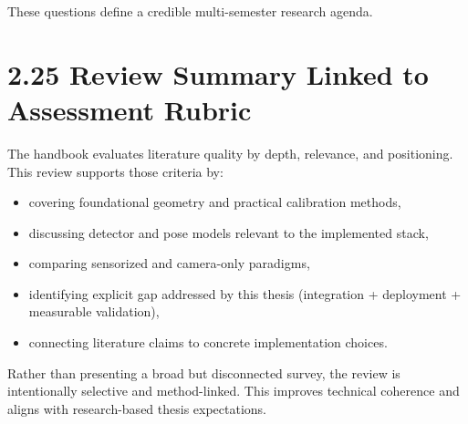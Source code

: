These questions define a credible multi-semester research agenda.



\section{2.25 Review Summary Linked to Assessment Rubric}
The handbook evaluates literature quality by depth, relevance, and positioning. This review supports those criteria by:
\begin{itemize}
  \item covering foundational geometry and practical calibration methods,
  \item discussing detector and pose models relevant to the implemented stack,
  \item comparing sensorized and camera-only paradigms,
  \item identifying explicit gap addressed by this thesis (integration + deployment + measurable validation),
  \item connecting literature claims to concrete implementation choices.
\end{itemize}

Rather than presenting a broad but disconnected survey, the review is intentionally selective and method-linked. This improves technical coherence and aligns with research-based thesis expectations.
